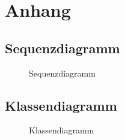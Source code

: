 \section{Anhang}
\clearpage
\setcounter{subsection}{8}
\setcounter{page}{7}
\setcounter{figure}{5}
\subsection{Sequenzdiagramm}
\label{app:Sequenz}
\begin{figure}[!htb]
    \centering
    \caption{Sequenzdiagramm}
\end{figure}
\clearpage

\setcounter{subsection}{10}
\setcounter{page}{9}
\setcounter{figure}{6}
\subsection{Klassendiagramm}
\label{app:Klassendiagramm}
\begin{figure}[!htb]
\centering
{}
\caption{Klassendiagramm}
\end{figure}

